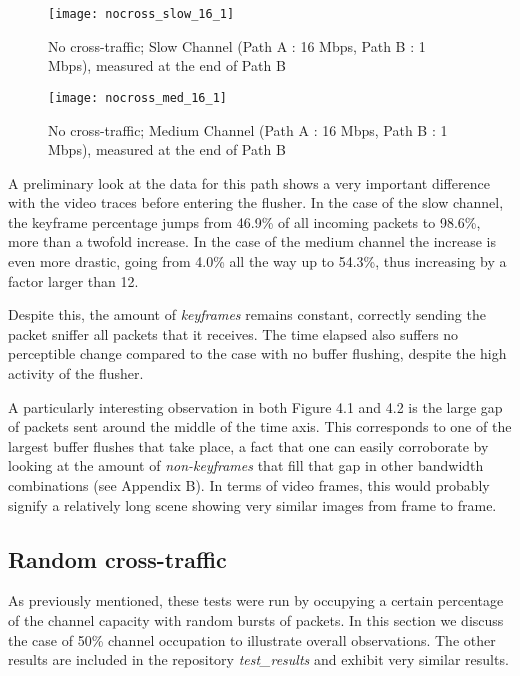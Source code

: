 \begin{figure}[!h]
\centering
\texttt{[image: nocross\_slow\_16\_1]}
\caption{No cross-traffic; Slow Channel (Path A : 16 Mbps, Path B : 1 Mbps), measured at the end of Path B}
\end{figure}

\begin{figure}[!h]
\centering
\texttt{[image: nocross\_med\_16\_1]}
\caption{No cross-traffic; Medium Channel (Path A : 16 Mbps, Path B : 1 Mbps), measured at the end of Path B}
\end{figure}

A preliminary look at the data for this path shows a very important difference with the video traces before entering the flusher. In the case of the slow channel, the keyframe percentage jumps from 46.9\% of all incoming packets to 98.6\%, more than a twofold increase. In the case of the medium channel the increase is even more drastic, going from 4.0\% all the way up to 54.3\%, thus increasing by a factor larger than 12.

Despite this, the amount of \textit{keyframes} remains constant, correctly sending the packet sniffer all packets that it receives. The time elapsed also suffers no perceptible change compared to the case with no buffer flushing, despite the high activity of the flusher.

A particularly interesting observation in both Figure 4.1 and 4.2 is the large gap of packets sent around the middle of the time axis. This corresponds to one of the largest buffer flushes that take place, a fact that one can easily corroborate by looking at the amount of \textit{non-keyframes} that fill that gap in other bandwidth combinations (see Appendix B). In terms of video frames, this would probably signify a relatively long scene showing very similar images from frame to frame.

\clearpage

\subsection{Random cross-traffic}

As previously mentioned, these tests were run by occupying a certain percentage of the channel capacity with random bursts of packets. In this section we discuss the case of 50\% channel occupation to illustrate overall observations. The other results are included in the repository \textit{test\_results} and exhibit very similar results.

